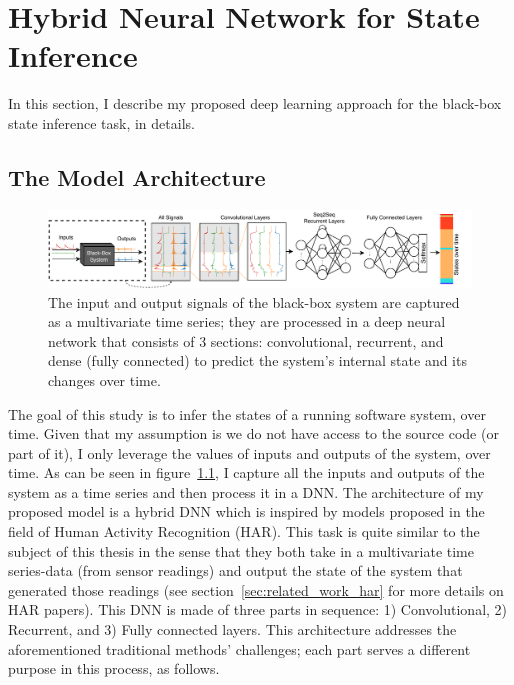 \chapter{Hybrid Neural Network for State Inference} \label{sec:approach}
In this section, I describe my proposed deep learning approach for the black-box state inference task, in details. 

\section{The Model Architecture}
\begin{figure}
    \centering
    \includegraphics[width=\textwidth]{ASE_files/GeneralConvolutionalNet.pdf}
    \caption{The input and output signals of the black-box system are captured as a multivariate time series; they are processed in a deep neural network that consists of 3 sections: convolutional, recurrent, and dense (fully connected) to predict the system's internal state and its changes over time.}
    \label{fig:general_net}
\end{figure}

The goal of this study is to infer the states of a running software system, over time. Given that my assumption is we do not have access to the source code (or part of it), I only leverage the values of inputs and outputs of the system, over time.
As can be seen in figure~\ref{fig:general_net}, I capture all the inputs and outputs of the system as a time series and then process it in a DNN. 
The architecture of my proposed model is a hybrid DNN which is inspired by models proposed in the field of Human Activity Recognition (HAR). This task is quite similar to the subject of this thesis in the sense that they both take in a multivariate time series-data (from sensor readings) and output the state of the system that generated those readings (see section~\ref{sec:related_work_har} for more details on HAR papers). 
This DNN is made of three parts in sequence: 1) Convolutional, 2) Recurrent, and 3) Fully connected layers. This architecture addresses the aforementioned traditional methods' challenges; each part serves a different purpose in this process, as follows.


